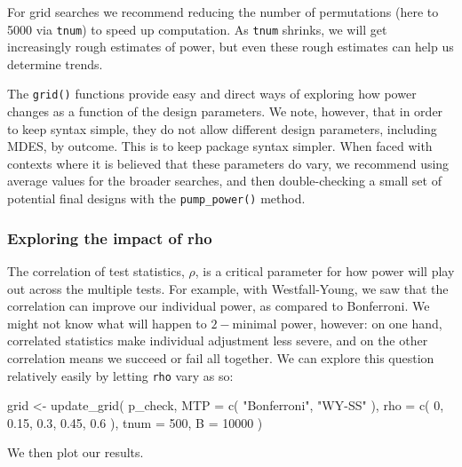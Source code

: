 \documentclass[
]{article}
\newenvironment{Shaded}{\begin{snugshade}}{\end{snugshade}}
\newcommand{\AttributeTok}[1]{\textcolor[rgb]{0.77,0.63,0.00}{#1}}
\newcommand{\DecValTok}[1]{\textcolor[rgb]{0.00,0.00,0.81}{#1}}
\newcommand{\FloatTok}[1]{\textcolor[rgb]{0.00,0.00,0.81}{#1}}
\newcommand{\FunctionTok}[1]{\textcolor[rgb]{0.00,0.00,0.00}{#1}}
\newcommand{\NormalTok}[1]{#1}
\newcommand{\OtherTok}[1]{\textcolor[rgb]{0.56,0.35,0.01}{#1}}
\newcommand{\StringTok}[1]{\textcolor[rgb]{0.31,0.60,0.02}{#1}}
\begin{document}
For grid searches we recommend reducing the number of permutations (here
to 5000 via \texttt{tnum}) to speed up computation. As \texttt{tnum}
shrinks, we will get increasingly rough estimates of power, but even
these rough estimates can help us determine trends.

The \texttt{grid()} functions provide easy and direct ways of exploring
how power changes as a function of the design parameters. We note,
however, that in order to keep syntax simple, they do not allow
different design parameters, including MDES, by outcome. This is to keep
package syntax simpler. When faced with contexts where it is believed
that these parameters do vary, we recommend using average values for the
broader searches, and then double-checking a small set of potential
final designs with the \texttt{pump\_power()} method.

\subsubsection{Exploring the impact of rho}

The correlation of test statistics, \(\rho\), is a critical parameter
for how power will play out across the multiple tests. For example, with
Westfall-Young, we saw that the correlation can improve our individual
power, as compared to Bonferroni. We might not know what will happen to
\(2-\)minimal power, however: on one hand, correlated statistics make
individual adjustment less severe, and on the other correlation means we
succeed or fail all together. We can explore this question relatively
easily by letting \texttt{rho} vary as so:

\begin{Shaded}
\begin{Highlighting}[]
\NormalTok{grid }\OtherTok{\textless{}{-}} \FunctionTok{update\_grid}\NormalTok{( p\_check,}
            \AttributeTok{MTP =} \FunctionTok{c}\NormalTok{( }\StringTok{"Bonferroni"}\NormalTok{, }\StringTok{"WY{-}SS"}\NormalTok{ ),}
            \AttributeTok{rho =} \FunctionTok{c}\NormalTok{( }\DecValTok{0}\NormalTok{, }\FloatTok{0.15}\NormalTok{, }\FloatTok{0.3}\NormalTok{, }\FloatTok{0.45}\NormalTok{, }\FloatTok{0.6}\NormalTok{ ),}
            \AttributeTok{tnum =} \DecValTok{500}\NormalTok{,}
            \AttributeTok{B =} \DecValTok{10000}\NormalTok{ )}
\end{Highlighting}
\end{Shaded}

We then plot our results.
\end{document}

